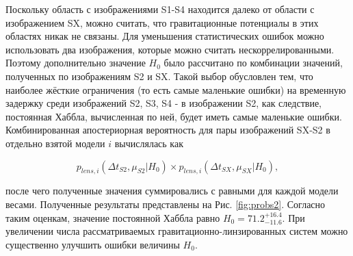 Поскольку область с изображениями S1-S4 находится далеко от области с изображением SX, можно считать, что гравитационные потенциалы в этих областях никак не связаны. Для уменьшения статистических ошибок можно использовать два изображения, которые можно считать нескоррелированными. Поэтому дополнительно значение $H_0$ было рассчитано по комбинации значений, полученных по изображениям S2 и SX. Такой выбор обусловлен тем, что наиболее жёсткие ограничения (то есть самые маленькие ошибки) на временную задержку среди изображений S2, S3, S4 - в изображении S2, как следствие, постоянная Хаббла, вычисленная по ней, будет иметь самые маленькие ошибки. Комбинированная апостериорная вероятность для пары изображений SX-S2 в отдельно взятой модели $i$ вычислялась как

\begin{equation}
p_{lens, i}(\Delta t_{S2},\mu_{S2}|H_0) × p_{lens,i}(\Delta t_{SX}, \mu_{SX}|H_0),
\end{equation}

\noindent после чего полученные значения суммировались с равными для каждой модели весами. Полученные результаты представлены на Рис. \ref{fig:probs2}. Согласно таким оценкам, значение постоянной Хаббла равно $H_0=71.2_ {-11.6}^{+16.4}$. При увеличении числа рассматриваемых гравитационно-линзированных систем можно существенно улучшить ошибки величины $H_0$.


